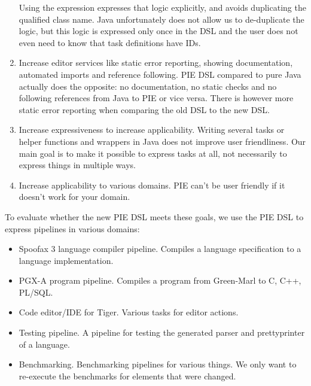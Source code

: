 \begin{enumerate}
  Using the expression  expresses that logic explicitly, and avoids duplicating the qualified class name.
  Java unfortunately does not allow us to de-duplicate the logic, but this logic is expressed only once in the DSL and the user does not even need to know that task definitions have IDs.
  \item Increase editor services like static error reporting, showing documentation, automated imports and reference following.
  PIE DSL compared to pure Java actually does the opposite: no documentation, no static checks and no following references from Java to PIE or vice versa. There is however more static error reporting when comparing the old DSL to the new DSL.
  \item Increase expressiveness to increase applicability.
  Writing several tasks or helper functions and wrappers in Java does not improve user friendliness.
  Our main goal is to make it possible to express tasks at all, not necessarily to express things in multiple ways.
  \item Increase applicability to various domains. PIE can't be user friendly if it doesn't work for your domain.
\end{enumerate}

To evaluate whether the new PIE DSL meets these goals, we use the PIE DSL to express pipelines in various domains:
\begin{itemize}
  \item Spoofax 3 language compiler pipeline.
  Compiles a language specification to a language implementation.
  \item PGX-A program pipeline.
  Compiles a program from Green-Marl to C, C++, PL/SQL.
  \item Code editor/IDE for Tiger.
  Various tasks for editor actions.
  \item Testing pipeline.
  A pipeline for testing the generated parser and prettyprinter of a language.
  \item Benchmarking.
  Benchmarking pipelines for various things. We only want to re-execute the benchmarks for elements that were changed.
\end{itemize}

